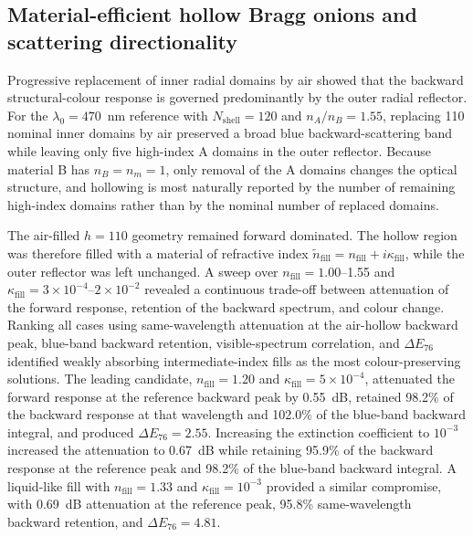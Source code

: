 
\subsection{Material-efficient hollow Bragg onions and scattering directionality}
Progressive replacement of inner radial domains by air showed that the backward
structural-colour response is governed predominantly by the outer radial reflector.
For the $\lambda_0=470$~nm reference with $N_{\mathrm{shell}}=120$ and
$n_A/n_B=1.55$, replacing 110 nominal inner domains by air preserved a broad blue
backward-scattering band while leaving only five high-index A domains in the outer
reflector. Because material B has $n_B=n_m=1$, only removal of the A domains changes
the optical structure, and hollowing is most naturally reported by the number of
remaining high-index domains rather than by the nominal number of replaced domains.

The air-filled $h=110$ geometry remained forward dominated. The hollow region was
therefore filled with a material of refractive index
$\widetilde n_{\mathrm{fill}}=n_{\mathrm{fill}}+i\kappa_{\mathrm{fill}}$, while the
outer reflector was left unchanged. A sweep over $n_{\mathrm{fill}}=1.00$--1.55 and
$\kappa_{\mathrm{fill}}=3\times10^{-4}$--$2\times10^{-2}$ revealed a continuous
trade-off between attenuation of the forward response, retention of the backward
spectrum, and colour change. Ranking all cases using same-wavelength attenuation at
the air-hollow backward peak, blue-band backward retention, visible-spectrum
correlation, and $\Delta E_{76}$ identified weakly absorbing intermediate-index
fills as the most colour-preserving solutions. The leading candidate,
$n_{\mathrm{fill}}=1.20$ and $\kappa_{\mathrm{fill}}=5\times10^{-4}$, attenuated
the forward response at the reference backward peak by 0.55~dB, retained 98.2\% of
the backward response at that wavelength and 102.0\% of the blue-band backward
integral, and produced $\Delta E_{76}=2.55$. Increasing the extinction coefficient
to $10^{-3}$ increased the attenuation to 0.67~dB while retaining 95.9\% of the
backward response at the reference peak and 98.2\% of the blue-band backward
integral. A liquid-like fill with $n_{\mathrm{fill}}=1.33$ and
$\kappa_{\mathrm{fill}}=10^{-3}$ provided a similar compromise, with 0.69~dB
attenuation at the reference peak, 95.8\% same-wavelength backward retention, and
$\Delta E_{76}=4.81$.

